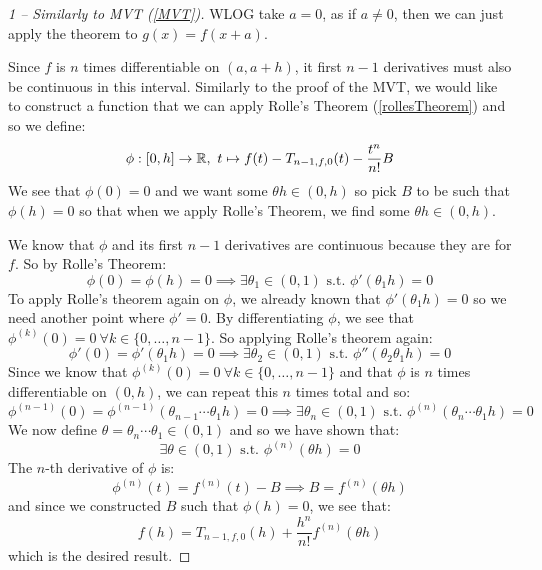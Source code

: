 \documentclass[../main.tex]{subfiles}
\begin{document}
\begin{proof}[1 -- Similarly to MVT (\cref{MVT})]\par
  WLOG take $a = 0$, as if $a \neq 0$, then we can just apply the theorem to $g(x) = f(x + a)$.

  Since $f$ is $n$ times differentiable on $(a, a + h)$, it first $n - 1$ derivatives must also be continuous in this interval.
  Similarly to the proof of the MVT, we would like to construct a function that we can apply Rolle's Theorem (\cref{rollesTheorem}) and so we define:
  \[
    \phi: [0, h] \to \mathbb{R},\ t \mapsto f(t) - T_{n - 1, f, 0}(t) - \frac{t^{n}}{n!} B
  \]
  We see that $\phi(0) = 0$ and we want some $\theta h \in (0, h)$ so pick $B$ to be such that $\phi(h) = 0$ so that when we apply Rolle's Theorem, we find some $\theta h \in (0, h)$.

  We know that $\phi$ and its first $n - 1$ derivatives are continuous because they are for $f$.
  So by Rolle's Theorem:
  \[
    \phi(0) = \phi(h) = 0 \implies \exists \theta_1 \in (0, 1) \text{ s.t. } \phi'(\theta_1 h) = 0
  \]
  To apply Rolle's theorem again on $\phi$, we already known that $\phi'(\theta_1 h) = 0$ so we need another point where $\phi' = 0$.
  By differentiating $\phi$, we see that $\phi^{(k)}(0) = 0\ \forall k \in \{0, \ldots, n - 1\}$.
  So applying Rolle's theorem again:
  \[
    \phi'(0) = \phi'(\theta_1h) = 0 \implies \exists \theta_2 \in (0, 1) \text{ s.t. } \phi''(\theta_2 \theta_1h) = 0
  \]
  Since we know that $\phi^{(k)}(0) = 0\ \forall k \in \{0, \ldots, n - 1\}$ and that $\phi$ is $n$ times differentiable on $(0, h)$,  we can repeat this $n$ times total and so:
  \[
    \phi^{(n - 1)}(0) = \phi^{(n - 1)}(\theta_{n-1} \cdots \theta_1 h) = 0 \implies \exists \theta_n \in (0, 1) \text{ s.t. } \phi^{(n)}(\theta_n \cdots \theta_1 h) = 0
  \]
  We now define $\theta = \theta_{n} \cdots \theta_1 \in (0, 1)$ and so we have shown that:
  \[
    \exists \theta \in (0, 1) \text{ s.t. } \phi^{(n)}(\theta h) = 0
  \]
  The $n$-th derivative of $\phi$ is:
  \[
    \phi^{(n)}(t) = f^{(n)}(t) - B \implies B = f^{(n)}(\theta h)
  \]
  and since we constructed $B$ such that $\phi(h) = 0$, we see that:
  \[
    f(h) = T_{n - 1, f, 0}(h) + \frac{h^{n}}{n!} f^{(n)}(\theta h)
  \]
  which is the desired result.
\end{proof}
\end{document}

